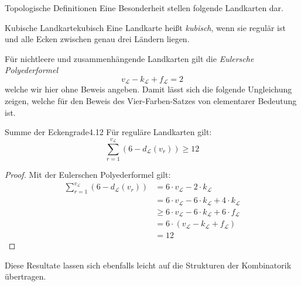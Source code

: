 \begin{section}{Topologische Definitionen}
 Eine Besonderheit stellen folgende Landkarten dar.
 
 \begin{definitionl}{Kubische Landkarte}{kubisch}
  Eine Landkarte heißt \textit{kubisch}, wenn sie regulär ist und alle Ecken zwischen genau drei Ländern liegen.
 \end{definitionl}

 Für nichtleere und zusammenhängende Landkarten gilt die \textit{Eulersche Polyederformel}
 \[v_\mathcal{L} - k_\mathcal{L} + f_\mathcal{L} = 2\]
 welche wir hier ohne Beweis angeben. Damit lässt sich die folgende Ungleichung zeigen, welche für den Beweis des Vier-Farben-Satzes von elementarer Bedeutung ist.
 
 \begin{satzl}{Summe der Eckengrade}{4.12}
  Für reguläre Landkarten gilt: \[\sum_{r=1}^{v_\mathcal{L}} (6-d_\mathcal{L}(v_r)) \geq 12\]
 \end{satzl}
 \begin{proof}
  Mit der Eulerschen Polyederformel gilt:
  \begin{align*}
    \sum_{r=1}^{v_\mathcal{L}} (6-d_\mathcal{L}(v_r)) &= 6\cdot v_\mathcal{L}-2\cdot k_\mathcal{L}\\
    &= 6\cdot v_\mathcal{L} - 6\cdot k_\mathcal{L} + 4\cdot k_\mathcal{L}\\
    &\geq 6\cdot v_\mathcal{L} - 6\cdot k_\mathcal{L} + 6\cdot f_\mathcal{L}\\
    &= 6\cdot (v_\mathcal{L} - k_\mathcal{L} + f_\mathcal{L})\\
    &= 12
  \end{align*}
 \end{proof}

 Diese Resultate lassen sich ebenfalls leicht auf die Strukturen der Kombinatorik übertragen.

\end{section}